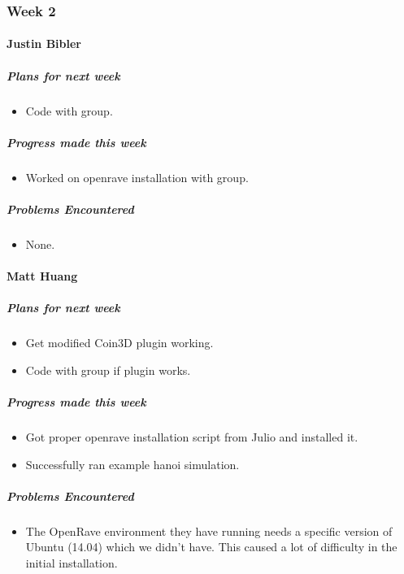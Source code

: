 \newpage

{
\subsubsection{Week 2}
\paragraph{Justin Bibler}
\subparagraph{Plans for next week}
\begin{itemize}
  \item Code with group.
\end{itemize}

\subparagraph{Progress made this week}
\begin{itemize}
  \item Worked on openrave installation with group.
\end{itemize}

\subparagraph{Problems Encountered}
\begin{itemize}
  \item None.
\end{itemize}
\vspace{3mm}

\paragraph{Matt Huang}
\subparagraph{Plans for next week}
\begin{itemize}
  \item Get modified Coin3D plugin working.
  \item Code with group if plugin works.
\end{itemize}

\subparagraph{Progress made this week}
\begin{itemize}
  \item Got proper openrave installation script from Julio and installed it.
  \item Successfully ran example hanoi simulation.
\end{itemize}

\subparagraph{Problems Encountered}
\begin{itemize}
  \item The OpenRave environment they have running needs a specific version of Ubuntu (14.04) which we didn't have. This caused a lot of difficulty in the initial installation.
\end{itemize}

}
